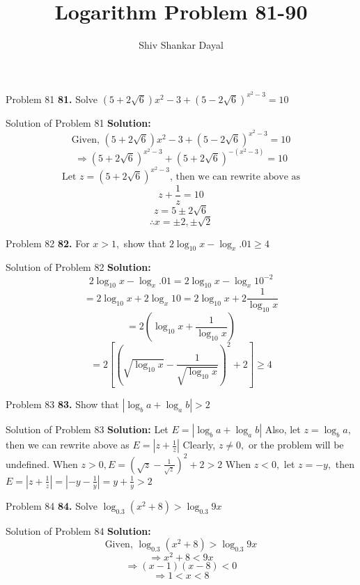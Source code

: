 \documentclass[aspectratio=169,8pt]{beamer}
\title{Logarithm Problem 81-90}
\author[Shiv Shankar Dayal]{Shiv Shankar Dayal}
\begin{document}
\begin{frame}
  \titlepage
\end{frame}
\begin{frame}{Problem 81}
  \textbf{81.} Solve $(5 + 2\sqrt{6}){x^2 - 3} + (5 - 2\sqrt{6})^{x^2 - 3} = 10$
\end{frame}
\begin{frame}{Solution of Problem 81}
  \textbf{Solution:} $$\text{Given,~}(5 + 2\sqrt{6}){x^2 - 3} + (5 - 2\sqrt{6})^{x^2 - 3} = 10$$
  $$\Rightarrow (5 + 2\sqrt{6})^{x^2 - 3} + (5 + 2\sqrt{6})^{-(x^2 - 3)} = 10$$
  $$\text{Let~}z = (5 + 2\sqrt{6})^{x^2 - 3}\text{,~then we can rewrite above as}$$
  $$z + \frac{1}{z} = 10$$
  $$z = 5 \pm 2\sqrt{6}$$
  $$\therefore x = \pm2, \pm\sqrt{2}$$
\end{frame}
\begin{frame}{Problem 82}
  \textbf{82.} For $x > 1,$ show that $2\log_{10}x - \log_x.01\geq 4$
\end{frame}
\begin{frame}{Solution of Problem 82}
  \textbf{Solution:} $$2\log_{10}x - \log_x.01 = 2\log_{10}x - \log_x10^{-2}$$
  $$= 2\log_{10}x + 2\log_x10 = 2\log_{10}x + 2\frac{1}{\log_{10}x}$$
  $$= 2\left(\log_{10}x + \frac{1}{\log_{10}x}\right)$$
  $$= 2\left[\left(\sqrt{\log_{10}x} - \frac{1}{\sqrt{\log_{10}x}}\right)^2 + 2\right] \geq 4$$
\end{frame}
\begin{frame}{Problem 83}
  \textbf{83.} Show that $|\log_ba + \log_ab| > 2$
\end{frame}
\begin{frame}{Solution of Problem 83}
  \textbf{Solution:} Let $E = |\log_ba + \log_ab|$
  \linebreak\linebreak
  Also, let $z = \log_ba,$ then we can rewrite above as $E = \left|z + \frac{1}{z}\right|$
  \linebreak\linebreak
  Clearly, $z\neq 0,$ or the problem will be undefined. When $z > 0, E = \left(\sqrt{z} - \frac{1}{\sqrt{z}}\right)^2 + 2 > 2$
  \linebreak\linebreak
  When $z < 0,$ let $z = -y,$ then $E = \left|z + \frac{1}{z}\right| = \left|-y - \frac{1}{y}\right| = y + \frac{1}{y} > 2$
\end{frame}
\begin{frame}{Problem 84}
  \textbf{84.} Solve $\log_{0.3}(x^2 + 8) > \log_{0.3}9x$
\end{frame}
\begin{frame}{Solution of Problem 84}
  \textbf{Solution:} $$\text{Given,~}\log_{0.3}(x^2 + 8) > \log_{0.3}9x$$
  $$\Rightarrow x^2 + 8 < 9x$$
  $$\Rightarrow (x - 1)(x - 8) < 0$$
  $$\Rightarrow 1 < x < 8$$
\end{frame}
\end{document}
